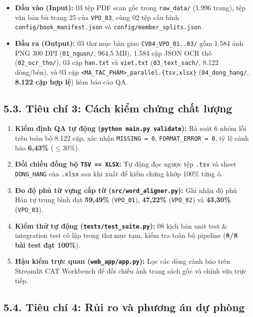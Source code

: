 \documentclass[11pt,a4paper]{article}
\begin{document}
\begin{itemize}
    \item \textbf{Đầu vào (Input):} 03 tệp PDF scan gốc trong \texttt{raw\_data/} (1.996 trang), tệp văn bản bù trang 25 của \texttt{VPO\_03}, cùng 02 tệp cấu hình \texttt{config/book\_manifest.json} và \texttt{config/member\_splits.json}.
    \item \textbf{Đầu ra (Output):} 03 thư mục bàn giao \texttt{CV04\_VPO\_01..03/} gồm 1.584 ảnh PNG 300 DPI (\texttt{01\_nguon/}, 964,5 MB), 1.584 cặp JSON OCR thô (\texttt{02\_ocr\_tho/}), 03 cặp \texttt{han.txt} và \texttt{viet.txt} (\texttt{03\_text\_sach/}, 8.122 dòng/bên), và 03 cặp \texttt{<MA\_TAC\_PHAM>\_parallel.\{tsv,xlsx\}} (\texttt{04\_dong\_hang/}, \textbf{8.122 cặp hợp lệ}) kèm báo cáo QA.
\end{itemize}

\subsection{5.3. Tiêu chí 3: Cách kiểm chứng chất lượng}

\begin{enumerate}
    \item \textbf{Kiểm định QA tự động (\texttt{python main.py validate}):} Rà soát 6 nhóm lỗi trên toàn bộ 8.122 cặp, xác nhận \texttt{MISSING = 0}, \texttt{FORMAT\_ERROR = 0}, tỷ lệ cảnh báo \textbf{6,43\%} ($\le 30\%$).
    \item \textbf{Đối chiếu đồng bộ \texttt{TSV == XLSX}:} Tự động đọc ngược tệp \texttt{.tsv} và sheet \texttt{DONG\_HANG} của \texttt{.xlsx} sau khi xuất để kiểm chứng khớp 100\% từng ô.
    \item \textbf{Đo độ phủ từ vựng cấp từ (\texttt{src/word\_aligner.py}):} Ghi nhận độ phủ Hán tự trung bình đạt \textbf{59,49\%} (\texttt{VPO\_01}), \textbf{47,22\%} (\texttt{VPO\_02}) và \textbf{43,30\%} (\texttt{VPO\_03}).
    \item \textbf{Kiểm thử tự động (\texttt{tests/test\_suite.py}):} 08 kịch bản unit test \& integration test cô lập trong thư mục tạm, kiểm tra toàn bộ pipeline (\textbf{8/8 bài test đạt 100\%}).
    \item \textbf{Hậu kiểm trực quan (\texttt{web\_app/app.py}):} Lọc các dòng cảnh báo trên Streamlit CAT Workbench để đối chiếu ảnh trang sách gốc và chỉnh sửa trực tiếp.
\end{enumerate}

\subsection{5.4. Tiêu chí 4: Rủi ro và phương án dự phòng}
\end{document}
